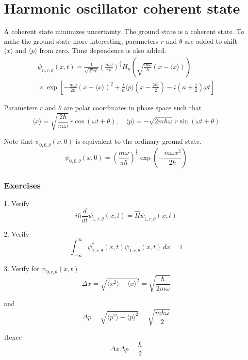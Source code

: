 

\section*{Harmonic oscillator coherent state}

A coherent state minimizes uncertainty.
The ground state is a coherent state.
To make the ground state more interesting, parameters $r$ and $\theta$ are added
to shift $\langle x\rangle$ and $\langle p\rangle$ from zero.
Time dependence is also added.
\begin{multline*}
\psi_{n,r,\theta}(x,t)
=\frac{1}{\sqrt{2^nn!}}
\left(\frac{m\omega}{\pi\hbar}\right)^\frac{1}{4}
H_n\left(\sqrt{\frac{m\omega}{\hbar}}\left(x-\langle x\rangle\right)\right)
\\{}\times
\exp\left[
-\frac{m\omega}{2\hbar}\left(x-\langle x\rangle\right)^2
+\frac{i}{\hbar}\langle p\rangle\left(x-\frac{\langle x\rangle}{2}\right)
-i\left(n+\frac{1}{2}\right)\omega t
\right]
\end{multline*}

Parameters $r$ and $\theta$ are polar coordinates in phase space such that
\begin{equation*}
\langle x\rangle=\sqrt{\frac{2\hbar}{m\omega}}\,r\cos(\omega t+\theta),\quad
\langle p\rangle=-\sqrt{2m\hbar\omega}\,r\sin(\omega t+\theta)
\end{equation*}

Note that $\psi_{0,0,\theta}(x,0)$ is equivalent to the ordinary ground state.
\begin{equation*}
\psi_{0,0,\theta}(x,0)=\left(\frac{m\omega}{\pi\hbar}\right)^\frac{1}{4}
\exp\left(-\frac{m\omega x^2}{2\hbar}\right)
\end{equation*}

\subsubsection*{Exercises}

1. Verify
\begin{equation*}
i\hbar\frac{d}{dt}\psi_{1,r,\theta}(x,t)=\hat H\psi_{1,r,\theta}(x,t)
\end{equation*}

2. Verify
\begin{equation*}
\int_{-\infty}^\infty\psi_{1,r,\theta}^*(x,t)\psi_{1,r,\theta}(x,t)\,dx=1
\end{equation*}

3. Verify for $\psi_{0,r,\theta}(x,t)$
\begin{equation*}
\Delta x=\sqrt{\langle x^2\rangle-\langle x\rangle^2}
=\sqrt{\frac{\hbar}{2m\omega}}
\end{equation*}

and
\begin{equation*}
\Delta p=\sqrt{\langle p^2\rangle-\langle p\rangle^2}
=\sqrt{\frac{m\hbar\omega}{2}}
\end{equation*}

Hence
\begin{equation*}
\Delta x\Delta p=\frac{\hbar}{2}
\end{equation*}


